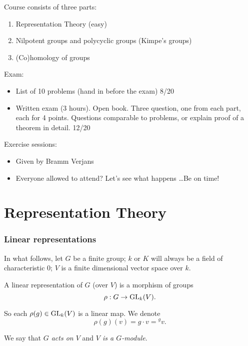 

Course consists of three parts:
\begin{enumerate}
    \item Representation Theory (easy)
    \item Nilpotent groups and polycyclic groups (Kimpe's groups)
    \item (Co)homology of groups
\end{enumerate}


Exam:
\begin{itemize}
    \item List of 10 problems (hand in before the exam) \hfill 8/20
    \item Written exam (3 hours). Open book. Three question, one from each part, each for 4 points.
        Questions comparable to problems, or explain proof of a theorem in detail. \hfill 12/20
\end{itemize}

Exercise sessions:
\begin{itemize}
    \item Given by Bramm Verjans
    \item Everyone allowed to attend? Let's see what happens \ldots Be on time!
\end{itemize}

\part{Representation Theory}


\section{Linear representations}

In what follows, let $G$ be a finite group; $k$ or  $K$ will always be a field of characteristic $0$; $V$ is a finite dimensional vector space over $k$.

\begin{definition}
    A linear representation of $G$ (over $V$) is a morphism of groups 
    \[
        \rho: G \to  \operatorname{GL}_k(V)
    .\] 
\end{definition}

So each $\rho(g) \in \operatorname{GL}_k(V)$ is a linear map.
We denote
\[
    \rho(g) (v) = g\cdot v = {}^{g} v
.\] 

We say that \emph{$G$ acts on $V$ } and \emph{$V$ is a $G$-module}.


